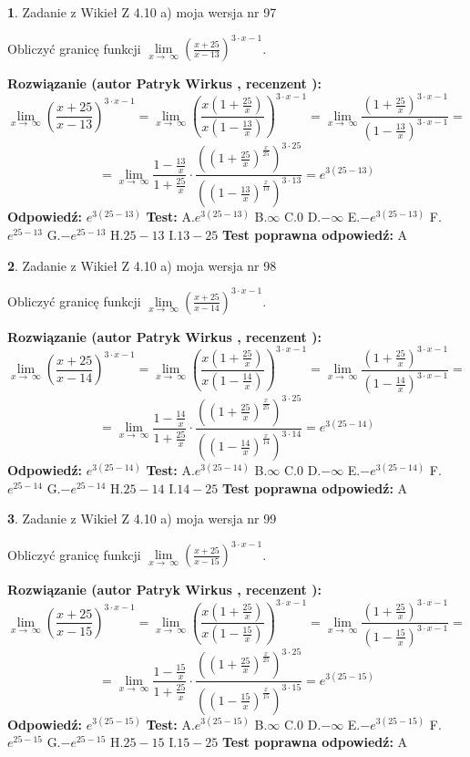 \documentclass[12pt, a4paper]{article}
\theoremstyle{definition} %
\newtheorem{zad}{}
\newcommand{\zadStart}[1]{\begin{zad}#1\newline}
\newcommand{\zadStop}{\end{zad}}
\newcommand{\rozwStart}[2]{\noindent \textbf{Rozwiązanie (autor #1 , recenzent #2): }\newline}
\newcommand{\rozwStop}{\newline}
\newcommand{\odpStart}{\noindent \textbf{Odpowiedź:}\newline}
\newcommand{\odpStop}{\newline}
\newcommand{\testStart}{\noindent \textbf{Test:}\newline}
\newcommand{\testStop}{\newline}
\newcommand{\kluczStart}{\noindent \textbf{Test poprawna odpowiedź:}\newline}
\newcommand{\kluczStop}{\newline}
\begin{document}
\zadStart{Zadanie z Wikieł Z 4.10 a) moja wersja nr 97}


Obliczyć granicę funkcji  $\lim\limits_{x\to\ \infty}(\frac{x+25}{x-13})^{3\cdot x-1}$.
\zadStop
\rozwStart{Patryk Wirkus}{}
$$\lim\limits_{x\to\ \infty}(\frac{x+25}{x-13})^{3\cdot x-1} = \lim\limits_{x\to\ \infty}(\frac{x(1+\frac{25}{x})}{x(1-\frac{13}{x})})^{3\cdot x-1}=\lim\limits_{x\to\ \infty}\frac{(1+\frac{25}{x})^{3\cdot x-1}}{(1-\frac{13}{x})^{3\cdot x-1}}=$$
$$=\lim\limits_{x\to\ \infty}\frac{1-\frac{13}{x}}{1+\frac{25}{x}}\cdot\frac{((1+\frac{25}{x})^{\frac{x}{25}})^{3\cdot25}}{((1-\frac{13}{x})^{\frac{x}{13}})^{3\cdot13}}=e^{3(25-13)}$$
\rozwStop
\odpStart
$e^{3(25-13)}$
\odpStop
\testStart
A.$e^{3(25-13)}$ B.$\infty$ C.$0$ D.$-\infty$ E.$-e^{3(25-13)}$
F.$e^{25-13}$ G.$-e^{25-13}$
H.$25-13$
I.$13-25$
\testStop
\kluczStart
A
\kluczStop



\zadStart{Zadanie z Wikieł Z 4.10 a) moja wersja nr 98}


Obliczyć granicę funkcji  $\lim\limits_{x\to\ \infty}(\frac{x+25}{x-14})^{3\cdot x-1}$.
\zadStop
\rozwStart{Patryk Wirkus}{}
$$\lim\limits_{x\to\ \infty}(\frac{x+25}{x-14})^{3\cdot x-1} = \lim\limits_{x\to\ \infty}(\frac{x(1+\frac{25}{x})}{x(1-\frac{14}{x})})^{3\cdot x-1}=\lim\limits_{x\to\ \infty}\frac{(1+\frac{25}{x})^{3\cdot x-1}}{(1-\frac{14}{x})^{3\cdot x-1}}=$$
$$=\lim\limits_{x\to\ \infty}\frac{1-\frac{14}{x}}{1+\frac{25}{x}}\cdot\frac{((1+\frac{25}{x})^{\frac{x}{25}})^{3\cdot25}}{((1-\frac{14}{x})^{\frac{x}{14}})^{3\cdot14}}=e^{3(25-14)}$$
\rozwStop
\odpStart
$e^{3(25-14)}$
\odpStop
\testStart
A.$e^{3(25-14)}$ B.$\infty$ C.$0$ D.$-\infty$ E.$-e^{3(25-14)}$
F.$e^{25-14}$ G.$-e^{25-14}$
H.$25-14$
I.$14-25$
\testStop
\kluczStart
A
\kluczStop



\zadStart{Zadanie z Wikieł Z 4.10 a) moja wersja nr 99}


Obliczyć granicę funkcji  $\lim\limits_{x\to\ \infty}(\frac{x+25}{x-15})^{3\cdot x-1}$.
\zadStop
\rozwStart{Patryk Wirkus}{}
$$\lim\limits_{x\to\ \infty}(\frac{x+25}{x-15})^{3\cdot x-1} = \lim\limits_{x\to\ \infty}(\frac{x(1+\frac{25}{x})}{x(1-\frac{15}{x})})^{3\cdot x-1}=\lim\limits_{x\to\ \infty}\frac{(1+\frac{25}{x})^{3\cdot x-1}}{(1-\frac{15}{x})^{3\cdot x-1}}=$$
$$=\lim\limits_{x\to\ \infty}\frac{1-\frac{15}{x}}{1+\frac{25}{x}}\cdot\frac{((1+\frac{25}{x})^{\frac{x}{25}})^{3\cdot25}}{((1-\frac{15}{x})^{\frac{x}{15}})^{3\cdot15}}=e^{3(25-15)}$$
\rozwStop
\odpStart
$e^{3(25-15)}$
\odpStop
\testStart
A.$e^{3(25-15)}$ B.$\infty$ C.$0$ D.$-\infty$ E.$-e^{3(25-15)}$
F.$e^{25-15}$ G.$-e^{25-15}$
H.$25-15$
I.$15-25$
\testStop
\kluczStart
A
\kluczStop
\end{document}
